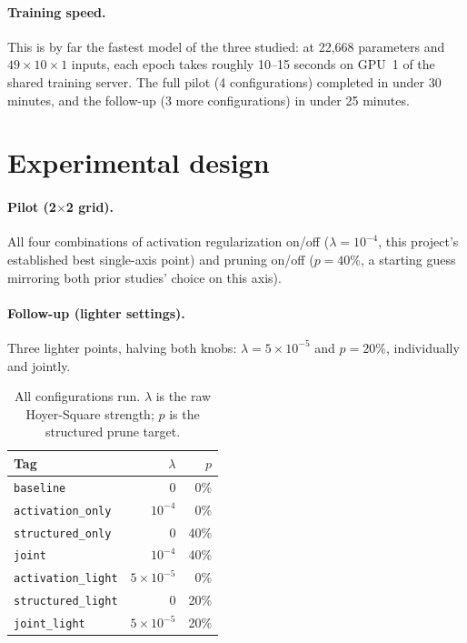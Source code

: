 \documentclass[11pt]{article}
\newcommand{\code}[1]{\texttt{#1}}
\begin{document}
\paragraph{Training speed.} This is by far the fastest model of the three studied: at 22{,}668 parameters and $49\times10\times1$ inputs, each epoch takes roughly 10--15 seconds on GPU~1 of the shared training server. The full pilot (4 configurations) completed in under 30 minutes, and the follow-up (3 more configurations) in under 25 minutes.

\section{Experimental design}

\paragraph{Pilot (2$\times$2 grid).} All four combinations of activation regularization on/off ($\lambda=10^{-4}$, this project's established best single-axis point) and pruning on/off ($p=40\%$, a starting guess mirroring both prior studies' choice on this axis).

\paragraph{Follow-up (lighter settings).} Three lighter points, halving both knobs: $\lambda=5\times10^{-5}$ and $p=20\%$, individually and jointly.

\begin{table}[H]
\centering
\caption{All configurations run. $\lambda$ is the raw Hoyer-Square strength; $p$ is the structured prune target.}
\label{tab:configs}
\begin{tabular}{@{}lrr@{}}
\toprule
Tag & $\lambda$ & $p$ \\
\midrule
\code{baseline} & 0 & 0\% \\
\code{activation\_only} & $10^{-4}$ & 0\% \\
\code{structured\_only} & 0 & 40\% \\
\code{joint} & $10^{-4}$ & 40\% \\
\code{activation\_light} & $5\times10^{-5}$ & 0\% \\
\code{structured\_light} & 0 & 20\% \\
\code{joint\_light} & $5\times10^{-5}$ & 20\% \\
\bottomrule
\end{tabular}
\end{table}
\end{document}
